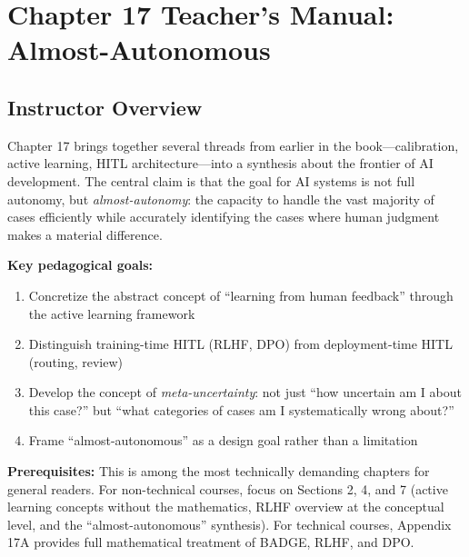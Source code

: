 
\section*{Chapter 17 Teacher's Manual: Almost-Autonomous}

\subsection*{Instructor Overview}

Chapter 17 brings together several threads from earlier in the book---calibration, active learning, HITL architecture---into a synthesis about the frontier of AI development. The central claim is that the goal for AI systems is not full autonomy, but \emph{almost-autonomy}: the capacity to handle the vast majority of cases efficiently while accurately identifying the cases where human judgment makes a material difference.

\textbf{Key pedagogical goals:}
\begin{enumerate}
    \item Concretize the abstract concept of ``learning from human feedback'' through the active learning framework
    \item Distinguish training-time HITL (RLHF, DPO) from deployment-time HITL (routing, review)
    \item Develop the concept of \emph{meta-uncertainty}: not just ``how uncertain am I about this case?'' but ``what categories of cases am I systematically wrong about?''
    \item Frame ``almost-autonomous'' as a design goal rather than a limitation
\end{enumerate}

\textbf{Prerequisites:} This is among the most technically demanding chapters for general readers. For non-technical courses, focus on Sections 2, 4, and 7 (active learning concepts without the mathematics, RLHF overview at the conceptual level, and the ``almost-autonomous'' synthesis). For technical courses, Appendix 17A provides full mathematical treatment of BADGE, RLHF, and DPO.


